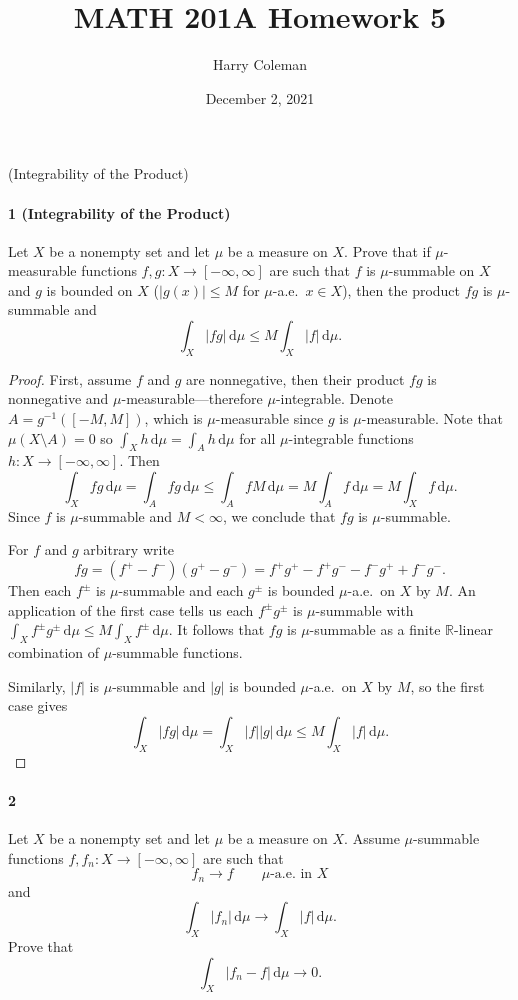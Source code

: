 \documentclass[12pt]{article}
\renewcommand{\maketitle}{\thispagestyle{title}}
\newlength{\myparskip}
\newenvironment{fullbox}{\begin{lrbox}{\savefullbox}\begin{minipage}{\dimexpr\textwidth-2\fboxsep\relax}\setlength{\parskip}{\myparskip}}{\end{minipage}\end{lrbox}\framebox[\textwidth]{\usebox{\savefullbox}}}
\newenvironment{pbox}[1][]{\begin{fullbox}\ifx#1\empty\else\paragraph{#1}\phantom{}\fi}{\end{fullbox}}
\theoremstyle{definition}
\newcommand{\R}{\mathbb{R}}
\newcommand{\<}{\langle}
\renewcommand{\>}{\rangle}
\newcommand{\dd}{\,\mathrm{d}}
\newcommand{\dto}{\longrightarrow}
\begin{document}
\title{MATH 201A Homework 5}
\author{Harry Coleman}
\date{December 2, 2021}
\maketitle

\begin{pbox}[1 (Integrability of the Product)]
    Let $X$ be a nonempty set and let $\mu$ be a measure on $X$.
    Prove that if $\mu$-measurable functions $f, g : X \to [-\infty, \infty]$ are such that $f$ is $\mu$-summable on $X$ and $g$ is bounded on $X$ ($|g(x)| \leq M$ for $\mu$-a.e.\ $x \in X$), then the product $fg$ is $\mu$-summable and
    \[
        \int_X |fg| \dd\mu \leq M \int_X |f| \dd\mu.
    \]
\end{pbox}

\begin{proof}
    First, assume $f$ and $g$ are nonnegative, then their product $fg$ is nonnegative and $\mu$-measurable---therefore $\mu$-integrable.
    Denote $A = g^{-1}([-M, M])$, which is $\mu$-measurable since $g$ is $\mu$-measurable.
    Note that $\mu(X \setminus A) = 0$ so $\int_X h \dd\mu = \int_A h \dd\mu$ for all $\mu$-integrable functions $h : X \to [-\infty, \infty]$.
    Then
    \[
        \int_X fg \dd\mu
            = \int_A fg \dd\mu
            \leq \int_A fM \dd\mu
            = M \int_A f \dd\mu
            = M \int_X f \dd\mu.
    \]
    Since $f$ is $\mu$-summable and $M < \infty$, we conclude that $fg$ is $\mu$-summable.
    
    For $f$ and $g$ arbitrary write
    \[
        fg
            = (f^+ - f^-)(g^+ - g^-)
            = f^+g^+ - f^+g^- - f^-g^+ + f^-g^-.
    \]
    Then each $f^\pm$ is $\mu$-summable and each $g^\pm$ is bounded $\mu$-a.e.\ on $X$ by $M$.
    An application of the first case tells us each $f^\pm g^\pm$ is $\mu$-summable with $\int_X f^\pm g^\pm \dd\mu \leq M \int_X f^\pm \dd\mu$.
    It follows that $fg$ is $\mu$-summable as a finite $\R$-linear combination of $\mu$-summable functions.
    
    Similarly, $|f|$ is $\mu$-summable and $|g|$ is bounded $\mu$-a.e.\ on $X$ by $M$, so the first case gives
    \[
        \int_X |fg| \dd\mu
            = \int_X |f||g| \dd\mu
            \leq M \int_X |f| \dd\mu.
    \]
\end{proof}

\newpage
\begin{pbox}[2]
    Let $X$ be a nonempty set and let $\mu$ be a measure on $X$.
    Assume $\mu$-summable functions $f, f_n : X \to [-\infty, \infty]$ are such that
    \[
        f_n \dto f \qquad \text{$\mu$-a.e.\ in $X$}
    \]
    and
    \[
        \int_X |f_n| \dd\mu \dto \int_X |f| \dd\mu.
    \]
    Prove that
    \[
        \int_X |f_n - f| \dd\mu \dto 0.
    \]
\end{pbox}
\end{document}

